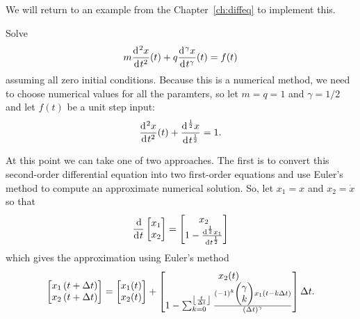 We will return to an example from the Chapter~\ref{ch:diffeq} to implement this.

\begin{example}
  Solve
  \begin{equation*}
    m \frac{\operatorname{d}\hspace*{-1pt}^2 x}{\operatorname{d}\hspace*{-1pt} t^2}(t) + q \frac{\operatorname{d}\hspace*{-1pt}^\gamma x}{\operatorname{d}\hspace*{-1pt} t^\gamma}(t) = f(t)
  \end{equation*}
  assuming all zero initial conditions. Because this is a numerical method, we need to choose numerical values for all the paramters, so let $m=q=1$ and $\gamma = 1/2$ and let $f(t)$ be a unit step input:
  \begin{equation*}
    \frac{\operatorname{d}\hspace*{-1pt}^2 x}{\operatorname{d}\hspace*{-1pt} t^2}(t) + \frac{\operatorname{d}\hspace*{-1pt}^\frac{1}{2} x}{\operatorname{d}\hspace*{-1pt} t^\frac{1}{2}} = 1.
  \end{equation*}

  At this point we can take one of two approaches. The first is to convert this second-order differential equation into two first-order equations and use Euler's method to compute an approximate numerical solution. So, let $x_1 = x$ and $x_2 = \dot x$ so that
  \begin{equation*}
    \frac{\operatorname{d}\hspace*{-1pt}}{\operatorname{d}\hspace*{-1pt} t}\begin{bmatrix}
    x_1 \\ x_2
    \end{bmatrix} = 
    \begin{bmatrix}
      x_2 \\
    1 - \frac{\operatorname{d}\hspace*{-1pt}^\frac{1}{2} x_1}{\operatorname{d}\hspace*{-1pt} t^\frac{1}{2}}
    \end{bmatrix}
  \end{equation*}
  which gives the approximation using Euler's method
  \begin{equation*}
    \begin{bmatrix}
      x_1\left(t + \Delta t \right) \\
      x_2\left(t + \Delta t \right)
    \end{bmatrix} =
    \begin{bmatrix}
      x_1(t) \\ x_2(t)
    \end{bmatrix} +
    \begin{bmatrix}
      x_2(t) \\
      1 - \sum_{k=0}^{\left\lfloor \frac{t}{\Delta t} \right\rfloor} \frac{(-1)^k  \begin{pmatrix} \gamma \\ k
      \end{pmatrix} x_1 \left( t - k \Delta t \right)}{\left( \Delta t \right)^\gamma}
    \end{bmatrix} 
    \Delta t.
  \end{equation*}


\end{example}
